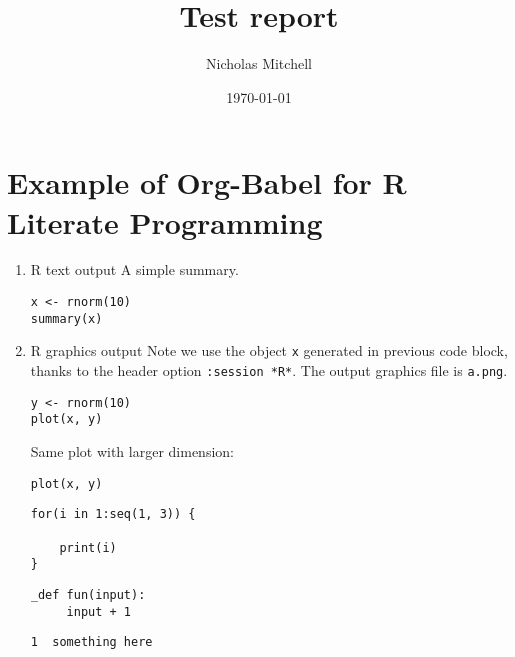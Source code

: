 \documentclass{article}
\author{Nicholas Mitchell}
\date{\today}
\title{Test report}
\begin{document}
\maketitle
\tableofcontents


\section{Example of Org-Babel for R Literate Programming}
\label{sec-1}
\begin{enumerate}
\item R text output
\label{sec-1-1}
A simple summary. 
\begin{verbatim}
x <- rnorm(10)
summary(x)
\end{verbatim}

\item R graphics output
\label{sec-1-2}
Note we use the object \texttt{x} generated in previous code block, thanks to
the header option \texttt{:session *R*}.  The output graphics file is
\texttt{a.png}. 

\begin{verbatim}
y <- rnorm(10)
plot(x, y)
\end{verbatim}

Same plot with larger dimension:

\begin{verbatim}
plot(x, y)
\end{verbatim}

\begin{verbatim}
for(i in 1:seq(1, 3)) {

    print(i)
}
\end{verbatim}

\begin{verbatim}
_def fun(input):
     input + 1
\end{verbatim}


\begin{verbatim}
1  something here
\end{verbatim}
\end{enumerate}
\end{document}
